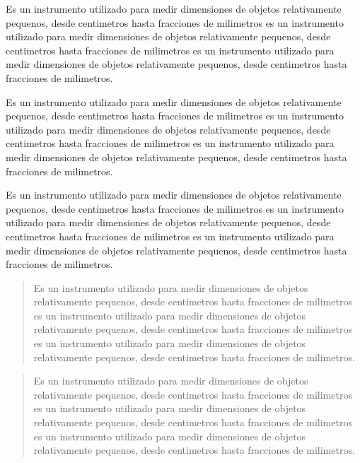 \documentclass[10pt,a4paper]{article}
\begin{document}
\newpage

\begin{flushleft}
	Es un instrumento utilizado para medir
dimensiones de objetos relativamente pequenos, desde centimetros hasta fracciones de milimetros es un instrumento utilizado para medir
dimensiones de objetos relativamente pequenos, desde centimetros hasta fracciones de milimetros es un instrumento utilizado para medir
dimensiones de objetos relativamente pequenos, desde centimetros hasta fracciones de milimetros. 
\end{flushleft}

\begin{flushright}
Es un instrumento utilizado para medir
dimensiones de objetos relativamente pequenos, desde centimetros hasta fracciones de milimetros es un instrumento utilizado para medir
dimensiones de objetos relativamente pequenos, desde centimetros hasta fracciones de milimetros es un instrumento utilizado para medir
dimensiones de objetos relativamente pequenos, desde centimetros hasta fracciones de milimetros. 
\end{flushright}

\begin{center}
Es un instrumento utilizado para medir
dimensiones de objetos relativamente pequenos, desde centimetros hasta fracciones de milimetros es un instrumento utilizado para medir
dimensiones de objetos relativamente pequenos, desde centimetros hasta fracciones de milimetros es un instrumento utilizado para medir
dimensiones de objetos relativamente pequenos, desde centimetros hasta fracciones de milimetros. 
\end{center}

\newpage

\begin{quote}
	Es un instrumento utilizado para medir
dimensiones de objetos relativamente pequenos, desde centimetros hasta fracciones de milimetros es un instrumento utilizado para medir
dimensiones de objetos relativamente pequenos, desde centimetros hasta fracciones de milimetros es un instrumento utilizado para medir
dimensiones de objetos relativamente pequenos, desde centimetros hasta fracciones de milimetros. 
\end{quote}

\begin{quotation}
	Es un instrumento utilizado para medir
dimensiones de objetos relativamente pequenos, desde centimetros hasta fracciones de milimetros es un instrumento utilizado para medir
dimensiones de objetos relativamente pequenos, desde centimetros hasta fracciones de milimetros es un instrumento utilizado para medir
dimensiones de objetos relativamente pequenos, desde centimetros hasta fracciones de milimetros. 
\end{quotation}
\end{document}
